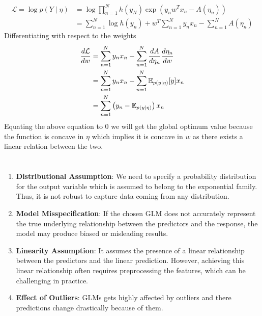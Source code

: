\documentclass{homework}
\begin{document}
\subsection{}\hfill \\
$$
\begin{aligned}
\mathcal L=\log p(Y\mid \eta) &= \log \prod_{n=1}^N h(y_N)\exp(y_nw^Tx_n - A(\eta_n))\\ 
&= \sum_{n=1}^N \log h(y_n) +w^T\sum_{n=1}^Ny_nx_n-\sum_{n=1}^NA(\eta_n)
\end{aligned}
$$
Differentiating with respect to the weights 
$$
\begin{aligned}
{d \mathcal L \over d w} &= \sum_{n=1}^{N} y_n x_n - \sum_{n=1}^N {d A \over d \eta_n} {d \eta_n \over d w}\\
&= \sum_{n=1}^{N} y_n x_n - \sum_{n=1}^N \mathbb{E}_{p(y\mid \eta)}[y] x_n\\
&= \sum_{n=1}^N \left(y_n - \mathbb{E}_{p(y\mid \eta)}\right) x_n
\end{aligned}
$$
Equating the above equation to $0$ we will get the global optimum value because the function is concave in $\eta$ which implies it is concave in $w$ as there exists a linear relation between the two.

\section{}
\begin{enumerate}
    \item \textbf{Distributional Assumption}: We need to specify a probability distribution for the output variable which is assumed to belong to the exponential family. Thus, it is not robust to capture data coming from any distribution.
    \item \textbf{Model Misspecification}: If the chosen GLM does not accurately represent the true underlying relationship between the predictors and the response, the model may produce biased or misleading results. 
    \item \textbf{Linearity Assumption}: It assumes the presence of a linear relationship between the predictors and the linear prediction. However, achieving this linear relationship often requires preprocessing the features, which can be challenging in practice.
    \item \textbf{Effect of Outliers}: GLMs gets highly affected by outliers and there predictions change drastically because of them.
\end{enumerate}
\end{document}
